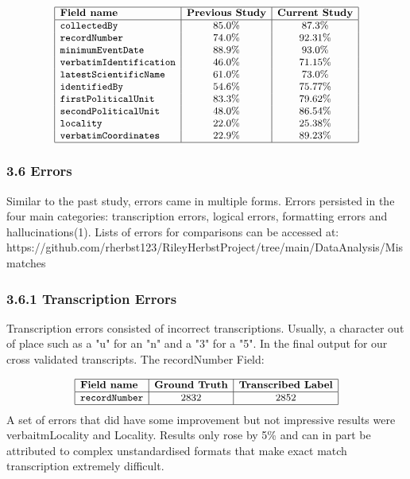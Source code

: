 \documentclass{article}
\begin{document}
$$\small
\begin{array}{|l|c|c|}
\hline
\textbf{Field name} & \textbf{Previous Study} & \textbf{Current Study} \\
\hline
\texttt{collectedBy}           & 85.0\% & 87.3\% \\
\texttt{recordNumber}          & 74.0\% & 92.31\% \\
\texttt{minimumEventDate}      & 88.9\% & 93.0\% \\
\texttt{verbatimIdentification}& 46.0\% & 71.15\% \\
\texttt{latestScientificName}  & 61.0\% & 73.0\% \\
\texttt{identifiedBy}          & 54.6\% & 75.77\% \\
\texttt{firstPoliticalUnit}    & 83.3\% & 79.62\% \\
\texttt{secondPoliticalUnit}   & 48.0\% & 86.54\% \\
\texttt{locality}              & 22.0\% & 25.38\% \\
\texttt{verbatimCoordinates}   & 22.9\% & 89.23\% \\
\hline
\end{array}
$$



\subsubsection*{3.6 Errors}
Similar to the past study, errors came in multiple forms. Errors persisted in the four main categories: transcription errors, logical errors, formatting errors and hallucinations(1). Lists of errors for comparisons can be accessed at: https://github.com/rherbst123/RileyHerbstProject/tree/main/DataAnalysis/Mismatches 

\subsubsection*{3.6.1 Transcription Errors}
Transcription errors consisted of incorrect transcriptions. Usually, a character out of place such as a "u" for an "n" and a "3" for a "5". In the final output for our cross validated transcripts. The recordNumber Field: 

$$\small
\begin{array}{|l|c|c|}
\hline
\textbf{Field name} & \textbf{Ground Truth} & \textbf{Transcribed Label} \\
\hline
\texttt{recordNumber} & 2832 & 2852 \\
\hline
\end{array}
$$
A set of errors that did have some improvement but not impressive results were verbaitmLocality and Locality. Results only rose by 5\% and can in part be attributed to complex unstandardised formats that make exact match transcription extremely difficult. 
\end{document}
